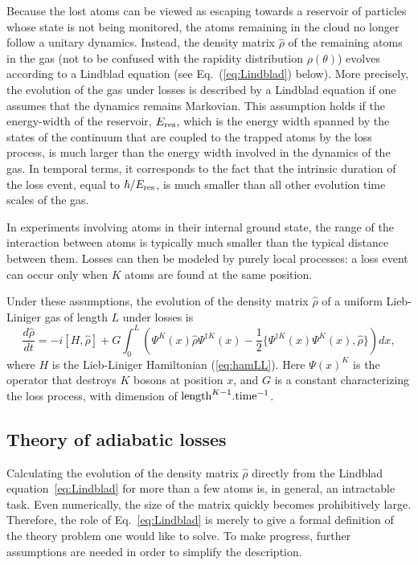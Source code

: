 \documentclass[onecolumn,amsfonts,showpacs,superscriptaddress]{revtex4-1}
\begin{document}
Because the lost atoms can be viewed as escaping towards a reservoir of particles whose state is not being monitored, the atoms remaining in the cloud no longer follow a unitary dynamics. 
Instead, the density matrix $\hat\rho$ of the remaining atoms in the gas (not to be confused with the rapidity distribution $\rho(\theta)$) evolves according to a Lindblad equation (see Eq.~(\ref{eq:Lindblad}) below). More precisely, the evolution of the gas under losses is described by a Lindblad equation if one assumes that the dynamics remains Markovian. This assumption holds if 
the energy-width of the reservoir, $E_{\rm res}$, which is the energy width spanned by the states of the continuum that are coupled to the trapped atoms by the loss process, is much larger than 
the energy width involved in the dynamics of the gas.
In temporal terms, it corresponds to the fact that  
the intrinsic duration of the loss event, equal to $\hbar/E_{\rm res}$, is much smaller than all other evolution time scales of the gas.



In experiments involving atoms in their internal ground state, the range of the interaction between atoms is typically much smaller than the typical distance between them. Losses can then be modeled by purely local processes: a loss event can occur only when $K$ atoms are found at the same position.


Under these assumptions, the evolution of the density matrix $\hat{\rho}$ of a uniform Lieb-Liniger gas of length $L$ under losses is
\begin{equation}
 \frac{d \hat{\rho}}{dt}   =  - i [H, \hat{\rho}]  	 + G \int_0^L \left(  \Psi^{K}(x)  \hat{\rho} \Psi^{\dagger K}(x)  - \frac{1}{2} \{ \Psi^{\dagger K}(x) \Psi^K(x) , \hat{\rho} \} \right) dx ,
 \label{eq:Lindblad}
\end{equation}
where $H$ is the Lieb-Liniger Hamiltonian (\ref{eq:hamLL}). Here $\Psi(x)^K$ is the operator that destroys $K$ bosons at position $x$, and $G$ is a constant characterizing the loss process, with dimension of ${\rm length}^{K-1}. {\rm time}^{-1}$.


\subsection{Theory of adiabatic losses}
Calculating the evolution of the density matrix $\hat \rho$ directly from the Lindblad equation~\eqref{eq:Lindblad} for more than a few atoms is, in general, an intractable task. Even numerically, the size of the matrix quickly becomes prohibitively large. Therefore, the role of Eq.~\eqref{eq:Lindblad} is merely to give a formal definition of the theory problem one would like to solve. To make progress, further assumptions are needed in order to simplify the description.
\end{document}
